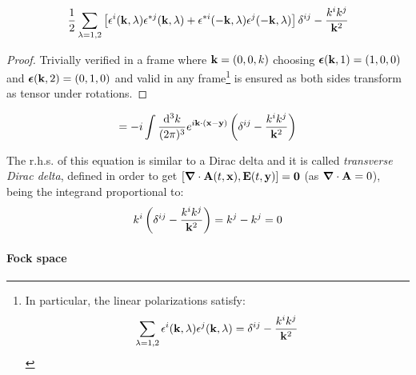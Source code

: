 %
%
\begin{lemma}[before upper = {\tcbtitle}]{}{}
  \begin{equation}
    \frac{1}{2} \sum_{\lambda = 1,2} \left[ \epsilon^i(\mathbf{k},\lambda) \epsilon^{*j}(\mathbf{k},\lambda) + \epsilon^{*i}(-\mathbf{k},\lambda) \epsilon^j(-\mathbf{k},\lambda) \right] \delta^{ij} - \frac{k^i k^j}{\mathbf{k}^2}
  \end{equation}
\end{lemma}

\begin{proofbox}
  \begin{proof}
    Trivially verified in a frame where $ \mathbf{k} = (0,0,k) $ choosing $ \boldsymbol{\epsilon}(\mathbf{k},1) = (1,0,0) $ and $ \boldsymbol{\epsilon}(\mathbf{k},2) = (0,1,0) $ and valid in any frame\footnote{In particular, the linear polarizations satisfy:
    \begin{equation}
      \sum_{\lambda = 1,2} \epsilon^i(\mathbf{k},\lambda) \epsilon^j(\mathbf{k},\lambda) = \delta^{ij} - \frac{k^i k^j}{\mathbf{k}^2}
    \end{equation}} is ensured as both sides transform as tensor under rotations.
  \end{proof}
\end{proofbox}

\begin{proposition}[before upper = {\tcbtitle}]{}{}
  \begin{equation}
    [A^i(t,\ve{x}) , E^j(t,\ve{y})] = - i \int \frac{\dd^3k}{(2\pi)^3} e^{i \ve{k} \cdot (\ve{x} - \ve{y})} \left( \delta^{ij} - \frac{k^i k^j}{\ve{k}^2} \right)
  \end{equation}
\end{proposition}

The r.h.s. of this equation is similar to a Dirac delta and it is called \textit{transverse Dirac delta}, defined in order to get $ [\boldsymbol{\nabla}\cdot \mathbf{A}(t,\mathbf{x}) , \mathbf{E}(t,\mathbf{y})] = \mathbf{0} $ (as $ \boldsymbol{\nabla}\cdot \mathbf{A} = 0 $), being the integrand proportional to:
\begin{equation*}
  k^i \left( \delta^{ij} - \frac{k^i k^j}{\mathbf{k}^2} \right) = k^j - k^j = 0
\end{equation*}

\paragraph{Fock space}

